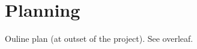 \chapter{Planning}\label{appendix_planning}

Ouline plan (at outset of the project). See overleaf.


